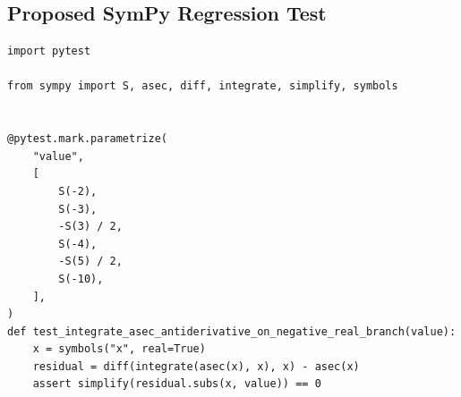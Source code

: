 \documentclass[11pt]{article}
\begin{document}
\subsection{Proposed SymPy Regression Test}

\medskip

\begin{lstlisting}[style=bugpython]
import pytest

from sympy import S, asec, diff, integrate, simplify, symbols


@pytest.mark.parametrize(
    "value",
    [
        S(-2),
        S(-3),
        -S(3) / 2,
        S(-4),
        -S(5) / 2,
        S(-10),
    ],
)
def test_integrate_asec_antiderivative_on_negative_real_branch(value):
    x = symbols("x", real=True)
    residual = diff(integrate(asec(x), x), x) - asec(x)
    assert simplify(residual.subs(x, value)) == 0
\end{lstlisting}
\end{document}
